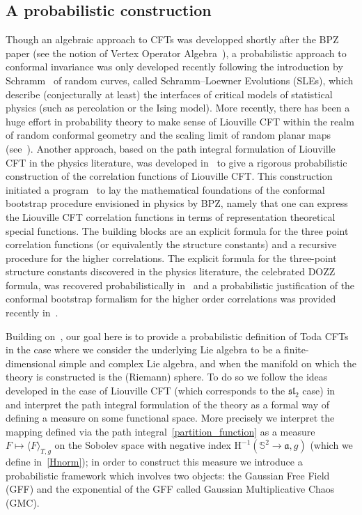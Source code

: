\documentclass[AHL,Unicode,longabstracts,published]{cedram}
\newcommand{\frksl}{\mathfrak{sl}}
\newcommand{\frka}{\mathfrak{a}}
\newcommand{\rmH}{\mathrm{H}}
\renewcommand*\S{\mathbb{S}}
\newcommand{\ps}[1]{\langle #1 \rangle}
\begin{document}
\subsection{A probabilistic construction}
Though an algebraic approach to CFTs was developped shortly after the BPZ paper (see the notion of Vertex Operator Algebra~\cite{Borcherds,FLM89}), a probabilistic approach to conformal invariance was only developed recently following the introduction by Schramm~\cite{schramm} of random curves, called Schramm--Loewner Evolutions (SLEs), which describe (conjecturally at least) the interfaces of critical models of statistical physics (such as percolation or the Ising model). More recently, there has been a huge effort in probability theory to make sense of Liouville CFT within the realm of random conformal geometry and the scaling limit of random planar maps (see~\cite{LeG13,Mie13,GM20,DMS14,DDDF,DFGPS}). Another approach, based on the path integral formulation of Liouville CFT in the physics literature, was developed in~\cite{DKRV,DRV16,HRV16,GRV16} to give a rigorous probabilistic construction of the correlation functions of Liouville CFT. This construction initiated a program~\cite{KRV_loc} to lay the mathematical foundations of the conformal bootstrap procedure envisioned in physics by BPZ, namely that one can express the Liouville CFT correlation functions in terms of representation theoretical special functions. The building blocks are an explicit formula for the three point correlation functions (or equivalently the structure constants) and a recursive procedure for the higher correlations. The explicit formula for the three-point structure constants discovered in the physics literature, the celebrated DOZZ formula, was recovered probabilistically in~\cite{KRV_DOZZ} and a probabilistic justification of the conformal bootstrap formalism for the higher order correlations was provided recently in~\cite{GKRV}.

Building on~\cite{DKRV}, our goal here is to provide a probabilistic definition of Toda CFTs in the case where we consider the underlying Lie algebra to be a finite-dimensional simple and complex Lie algebra, and when the manifold on which the theory is constructed is the (Riemann) sphere. To do so we follow the ideas developed in the case of Liouville CFT (which corresponds to the $\frksl_2$ case) in~\cite{DKRV} and interpret the path integral formulation of the theory as a formal way of defining a measure on some functional space. More precisely we interpret the mapping defined via the path integral~\eqref{partition_function} as a measure $F\mapsto\ps{F}_{T,g}$ on the Sobolev space with negative index $\rmH^{-1}(\S^2\to\frka,g)$ (which we define in~\eqref{Hnorm}); in order to construct this measure we introduce a probabilistic framework which involves two objects: the Gaussian Free Field (GFF) and the exponential of the GFF called Gaussian Multiplicative Chaos (GMC).
\end{document}
